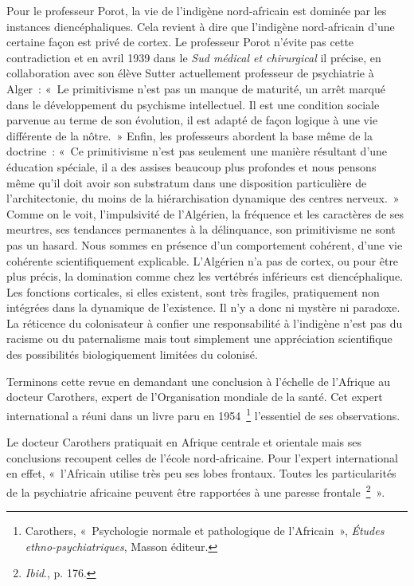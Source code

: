 \documentclass[french,twoside]{book} %
\begin{document}
 Pour le professeur Porot, la vie de l’indigène nord-africain est dominée par les instances diencéphaliques. Cela revient à dire que l’indigène nord-africain d’une certaine façon est privé de cortex. Le professeur Porot n’évite pas cette contradiction et en avril 1939 dans le \emph{Sud médical et chirurgical} il précise, en collaboration avec son élève Sutter actuellement professeur de psychiatrie à Alger : « Le primitivisme n’est pas un manque de maturité, un arrêt marqué dans le développement du psychisme intellectuel. Il est une condition sociale parvenue au terme de son évolution, il est adapté de façon logique à une vie différente de la nôtre. » Enfin, les professeurs abordent la base même de la doctrine : « Ce primitivisme n’est pas seulement une manière résultant d’une éducation spéciale, il a des assises beaucoup plus profondes et nous pensons même qu’il doit avoir son substratum dans une disposition particulière de l’architectonie, du moins de la hiérarchisation dynamique des centres nerveux. » Comme on le voit, l’impulsivité de l’Algérien, la fréquence et les caractères de ses meurtres, ses tendances permanentes à la délinquance, son primitivisme ne sont pas un hasard. Nous sommes en présence d’un comportement cohérent, d’une vie cohérente scientifiquement explicable. L’Algérien n’a pas de cortex, ou pour être plus précis, la domination comme chez les vertébrés inférieurs est diencéphalique. Les fonctions corticales, si elles existent, sont très fragiles, pratiquement non intégrées dans la dynamique de l’existence. Il n’y a donc ni mystère ni paradoxe. La réticence du colonisateur à confier une responsabilité à l’indigène n’est pas du racisme ou du paternalisme mais tout simplement une appréciation scientifique des possibilités biologiquement limitées du colonisé.\par
Terminons cette revue en demandant une conclusion à l’échelle de l’Afrique au docteur Carothers, expert de l’Organisation mondiale de la santé. Cet expert international a réuni dans un livre paru en 1954 \footnote{Carothers, « Psychologie normale et pathologique de l’Africain », \emph{Études ethno-psychiatriques}, Masson éditeur.} l’essentiel de ses observations.\par
 Le docteur Carothers pratiquait en Afrique centrale et orientale mais ses conclusions recoupent celles de l’école nord-africaine. Pour l’expert international en effet, « l’Africain utilise très peu ses lobes frontaux. Toutes les particularités de la psychiatrie africaine peuvent être rapportées à une paresse frontale \footnote{\emph{Ibid}., p. 176.} ».\par
\end{document}
